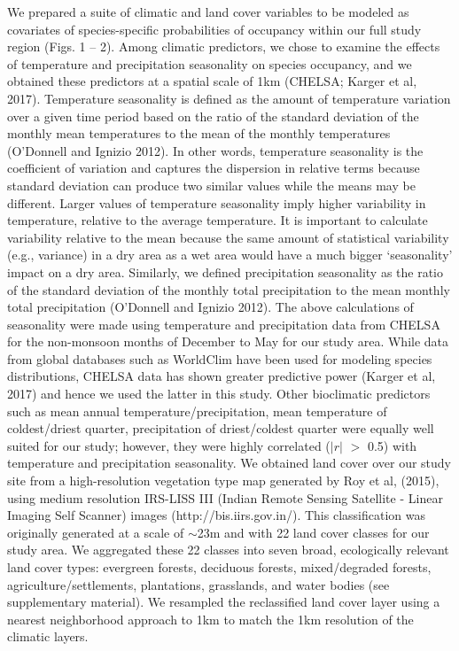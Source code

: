 We prepared a suite of climatic and land cover variables to be modeled as covariates of species-specific probabilities of occupancy within our full study region (Figs.
1 -- 2).
Among climatic predictors, we chose to examine the effects of temperature and precipitation seasonality on species occupancy, and we obtained these predictors at a spatial scale of 1km (CHELSA; Karger et al, 2017).
Temperature seasonality is defined as the amount of temperature variation over a given time period based on the ratio of the standard deviation of the monthly mean temperatures to the mean of the monthly temperatures (O'Donnell and Ignizio 2012).
In other words, temperature seasonality is the coefficient of variation and captures the dispersion in relative terms because standard deviation can produce two similar values while the means may be different.
Larger values of temperature seasonality imply higher variability in temperature, relative to the average temperature.
It is important to calculate variability relative to the mean because the same amount of statistical variability (e.g., variance) in a dry area as a wet area would have a much bigger `seasonality' impact on a dry area.
Similarly, we defined precipitation seasonality as the ratio of the standard deviation of the monthly total precipitation to the mean monthly total precipitation (O'Donnell and Ignizio 2012).
The above calculations of seasonality were made using temperature and precipitation data from CHELSA for the non-monsoon months of December to May for our study area.
While data from global databases such as WorldClim have been used for modeling species distributions, CHELSA data has shown greater predictive power (Karger et al, 2017) and hence we used the latter in this study.
Other bioclimatic predictors such as mean annual temperature/precipitation, mean temperature of coldest/driest quarter, precipitation of driest/coldest quarter were equally well suited for our study; however, they were highly correlated ($|r|$ $>$ 0.5) with temperature and precipitation seasonality.
We obtained land cover over our study site from a high-resolution vegetation type map generated by Roy et al, (2015), using medium resolution IRS-LISS III (Indian Remote Sensing Satellite - Linear Imaging Self Scanner) images (http://bis.iirs.gov.in/).
This classification was originally generated at a scale of $\sim$23m and with 22 land cover classes for our study area.
We aggregated these 22 classes into seven broad, ecologically relevant land cover types: evergreen forests, deciduous forests, mixed/degraded forests, agriculture/settlements, plantations, grasslands, and water bodies (see supplementary material).
We resampled the reclassified land cover layer using a nearest neighborhood approach to 1km to match the 1km resolution of the climatic layers.

